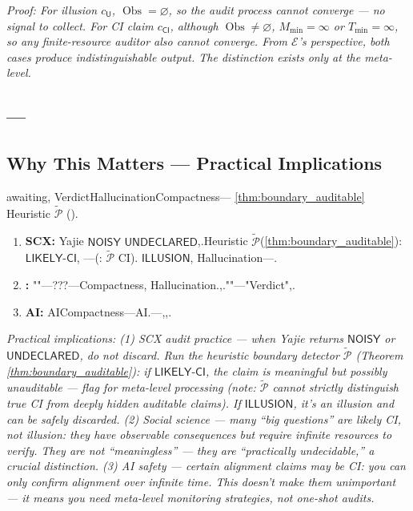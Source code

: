 \documentclass[12pt,a4paper]{article}
\theoremstyle{plain}
\theoremstyle{definition}
\theoremstyle{remark}
\newcommand{\Null}{\varnothing}
\DeclareMathOperator{\ObsSet}{Obs}
\newcommand{\UD}{\mathsf{UNDECLARED}}
\newcommand{\NOISY}{\mathsf{NOISY}}
\begin{document}
\vspace{4pt}
\noindent
\textit{Proof: For illusion $c_{\mathsf{U}}$, $\ObsSet = \Null$, so the audit process cannot converge --- no signal to collect. For CI claim $c_{\mathsf{CI}}$, although $\ObsSet \neq \Null$, $M_{\min} = \infty$ or $T_{\min} = \infty$, so any finite-resource auditor also cannot converge. From $\mathcal{E}$'s perspective, both cases produce indistinguishable output. The distinction exists only at the meta-level.}
\subsection{---}
\subsection{Why This Matters --- Practical Implications}
awaiting, VerdictHallucinationCompactness--- \ref{thm:boundary_auditable} Heuristic $\widetilde{\mathcal{P}}$ ().
\begin{enumerate}[label=(\arabic*)]
 \item \textbf{SCX: } Yajie $\NOISY$ $\UD$,.Heuristic $\widetilde{\mathcal{P}}$(\ref{thm:boundary_auditable}): $\mathsf{LIKELY\text{-}CI}$, \textit{}---(: $\widetilde{\mathcal{P}}$ CI). $\mathsf{ILLUSION}$, Hallucination---.
 \item \textbf{: } ""---???---Compactness, Hallucination.,.""---"Verdict",.
 \item \textbf{AI: } AICompactness---AI.---,,.
\end{enumerate}
\vspace{4pt}
\noindent
\textit{Practical implications: (1) SCX audit practice --- when Yajie returns $\NOISY$ or $\UD$, do not discard. Run the heuristic boundary detector $\widetilde{\mathcal{P}}$ (Theorem \ref{thm:boundary_auditable}): if $\mathsf{LIKELY\text{-}CI}$, the claim is meaningful but possibly unauditable --- flag for meta-level processing (note: $\widetilde{\mathcal{P}}$ cannot strictly distinguish true CI from deeply hidden auditable claims). If $\mathsf{ILLUSION}$, it's an illusion and can be safely discarded. (2) Social science --- many ``big questions'' are likely CI, not illusion: they have observable consequences but require infinite resources to verify. They are not ``meaningless'' --- they are ``practically undecidable,'' a crucial distinction. (3) AI safety --- certain alignment claims may be CI: you can only confirm alignment over infinite time. This doesn't make them unimportant --- it means you need meta-level monitoring strategies, not one-shot audits.}
\end{document}

